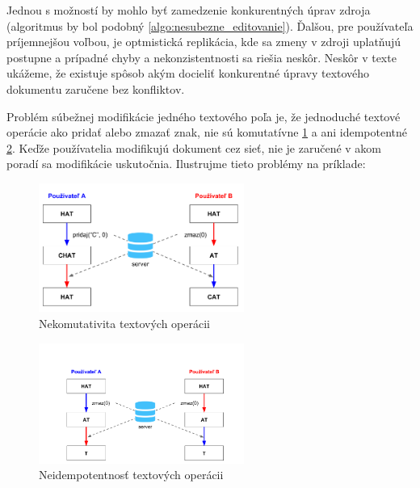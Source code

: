 Jednou s možností by mohlo byť zamedzenie konkurentných úprav zdroja (algoritmus by bol podobný
\ref{algo:nesubezne_editovanie}). Ďalšou, pre používateľa príjemnejšou voľbou, je optmistická
replikácia, kde sa zmeny v zdroji uplatňujú postupne a prípadné chyby a nekonzistentnosti sa
riešia neskôr. Neskôr v texte ukážeme, že existuje spôsob akým docieliť konkurentné úpravy 
textového dokumentu zaručene bez konfliktov. %

Problém súbežnej modifikácie jedného textového poľa je, že jednoduché textové operácie ako
pridať alebo zmazať znak, nie sú komutatívne \ref{obr:nekomutativita} a ani 
idempotentné \ref{obr:neidempotentnost}. Keďže používatelia
modifikujú dokument cez sieť, nie je zaručené v akom poradí sa modifikácie uskutočnia. 
\cite {medium_crdt}
Ilustrujme tieto problémy na príklade:

\begin{figure}[h]
\centerline{\includegraphics[width=0.6\textwidth]{images/nekomutativne_operacie}}
\caption[Nekomutativita textových operácii]{Nekomutativita textových operácii}
\label{obr:nekomutativita}
\end{figure}

\begin{figure}[h]
\centerline{\includegraphics[width=0.6\textwidth]{images/neidempotentne_operacie}}
\caption[Neidempotentnosť textových operácii]{Neidempotentnosť textových operácii}
\label{obr:neidempotentnost}
\end{figure}

